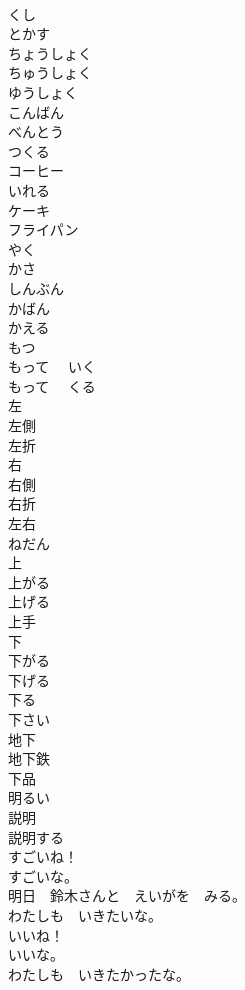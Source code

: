 \documentclass[8pt]{extreport}
\begin{document}
\begin{CJK}{UTF8}{min}
\\	くし	
\\	とかす	
\\	ちょうしょく	
\\	ちゅうしょく	
\\	ゆうしょく	
\\	こんばん	
\\	べんとう	
\\	つくる	
\\	コーヒー	
\\	いれる	
\\	ケーキ	
\\	フライパン	
\\	やく	
\\	かさ	
\\	しんぶん	
\\	かばん	
\\	かえる	
\\	もつ	
\\	もって　 いく	
\\	もって　 くる	
\\	左	
\\	左側	
\\	左折	
\\	右	
\\	右側	
\\	右折	
\\	左右	
\\	ねだん	
\\	上	
\\	上がる	
\\	上げる	
\\	上手	
\\	下	
\\	下がる	
\\	下げる	
\\	下る	
\\	下さい	
\\	地下	
\\	地下鉄	
\\	下品	
\\	明るい	
\\	説明	
\\	説明する	
\\	すごいね！	
\\	すごいな。	
\\	明日　鈴木さんと　えいがを　みる。	
\\	わたしも　いきたいな。	
\\	いいね！	
\\	いいな。	
\\	わたしも　いきたかったな。	

\end{CJK}
\end{document}
